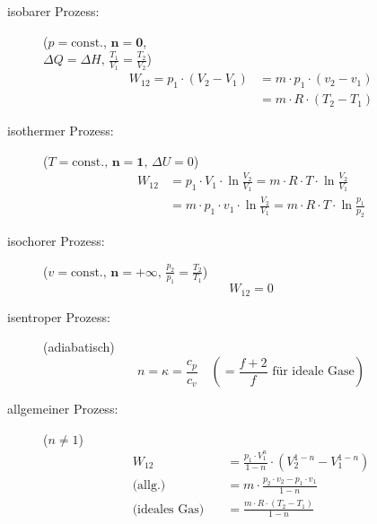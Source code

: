 			\begin{description}
				\item[isobarer Prozess:] ($p=\text{const.}$, $\boldsymbol{n=0}$,\\ $\Delta Q = \Delta H,\, \frac{T_1}{V_1} = \frac{T_2}{V_2}$)
				\begin{align*}
					W_{12} = p_1 \cdot (V_2 - V_1) &= m \cdot p_1 \cdot (v_2 - v_1) \\ &= m\cdot R \cdot (T_2 - T_1)
				\end{align*}
				
				\item[isothermer Prozess:] ($T=\text{const.},\, \boldsymbol{n=1},\, \Delta U = 0$)
				\begin{align*}
					W_{12} &= p_1 \cdot V_1 \cdot \ln \frac{V_2}{V_1} = m \cdot R \cdot T \cdot \ln \frac{V_2}{V_1} \\
					&= m\cdot p_1 \cdot v_1 \cdot \ln \frac{V_2}{V_1} = m \cdot R \cdot T \cdot \ln \frac{p_1}{p_2}
				\end{align*}
				
				\item[isochorer Prozess:] ($v=\text{const.},\, \boldsymbol{n=+\infty},\, \frac{p_2}{p_1} = \frac{T_2}{T_1}$)
				\[
					W_{12} = 0
				\]
				
				\item[isentroper Prozess:] (adiabatisch)
				\[
					n = \kappa = \frac{c_p}{c_v} \quad \left( = \frac{f+2}{f} \text{ für ideale Gase} \right)
				\]
				
				
				\item[allgemeiner Prozess:] ($n\neq 1$)
				\begin{align*}
					W_{12} &= \frac{p_1 \cdot V_1^n}{1-n} \cdot (V_2^{1-n} - V_1^{1-n}) \\
					\text{(allg.)}\quad &= m \cdot \frac{p_2 \cdot v_2 - p_1 \cdot v_1}{1-n} \\
					\text{(ideales Gas)}\quad &= \frac{m \cdot R \cdot (T_2 - T_1)}{1-n}
				\end{align*}
			\end{description}
		
	
